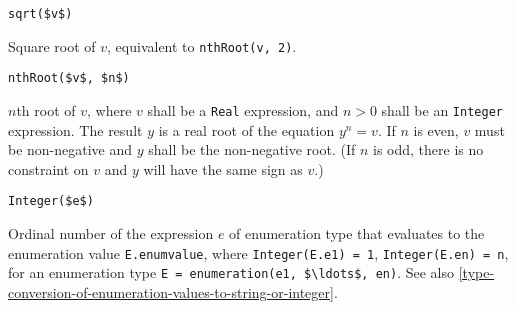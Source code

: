 \begin{functiondefinition}[sqrt]
\begin{synopsis}\begin{lstlisting}
sqrt($v$)
\end{lstlisting}\end{synopsis}
\begin{semantics}
Square root of $v$, equivalent to \lstinline!nthRoot(v, 2)!.
\end{semantics}
\end{functiondefinition}

\begin{functiondefinition}[nthRoot]
\begin{synopsis}\begin{lstlisting}
nthRoot($v$, $n$)
\end{lstlisting}\end{synopsis}
\begin{semantics}
$n$th root of $v$, where $v$ shall be a \lstinline!Real! expression, and $n > 0$ shall be an \lstinline!Integer! expression.
The result $y$ is a real root of the equation $y^{n} = v$.
If $n$ is even, $v$ must be non-negative and $y$ shall be the non-negative root.
(If $n$ is odd, there is no constraint on $v$ and $y$ will have the same sign as $v$.)
\end{semantics}
\end{functiondefinition}

\begin{operatordefinition*}[Integer]\label{modelica:integer-of-enumeration}
\begin{synopsis}\begin{lstlisting}
Integer($e$)
\end{lstlisting}\end{synopsis}
\begin{semantics}
Ordinal number of the expression $e$ of enumeration type that evaluates to the enumeration value \lstinline!E.enumvalue!, where \lstinline!Integer(E.e1) = 1!, \lstinline!Integer(E.en) = n!, for an enumeration type \lstinline!E = enumeration(e1, $\ldots$, en)!.
See also \cref{type-conversion-of-enumeration-values-to-string-or-integer}.
\end{semantics}
\end{operatordefinition*}

